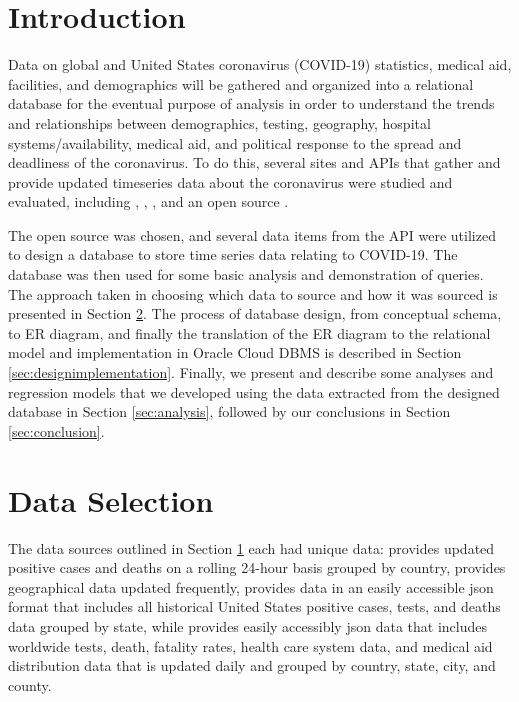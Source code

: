 \documentclass[11pt]{article}
\newcommand{\MYhref}[3][blue]{\href{#2}{\color{#1}{#3}}}%
\begin{document}
\pagebreak

\section{Introduction}
\label{sec:Intro}
\noindent
Data on global and United States coronavirus (COVID-19) statistics, medical aid, facilities, and demographics will be gathered and organized into a relational database for the eventual purpose of analysis in order to understand the trends and relationships between demographics, testing, geography, hospital systems/availability, medical aid, and political response to the spread and deadliness of the coronavirus. To do this, several sites and APIs that gather and provide updated timeseries data about the coronavirus were studied and evaluated, including \MYhref{https://www.worldometers.info/coronavirus/}{Worldometer}, \MYhref{https://coronavirus.jhu.edu/map.html}{John Hopkins Coronavirus Resource Center}, \MYhref{https://covidtracking.com/api}{The Covid Tracking Project}, and an open source \MYhref{https://www.npmjs.com/package/covid19-api}{Covid-19 API}. 

\noindent
The open source \MYhref{https://www.npmjs.com/package/covid19-api}{Covid-19 API} was chosen, and several data items from the API were utilized to design a database to store time series data relating to COVID-19. The database was then used for some basic analysis and demonstration of queries. The approach taken in choosing which data to source and how it was sourced is presented in Section \ref{sec:approachsec}. The process of database design, from conceptual schema, to ER diagram, and finally the translation of the ER diagram to the relational model and implementation in Oracle Cloud DBMS is described in Section \ref{sec:designimplementation}. Finally, we present and describe some analyses and regression models that we developed using the data extracted from the designed database in Section \ref{sec:analysis}, followed by our conclusions in Section \ref{sec:conclusion}.

\section{Data Selection}
\label{sec:approachsec}

\noindent
The data sources outlined in Section \ref{sec:Intro} each had unique data: \MYhref{https://www.worldometers.info/coronavirus/}{Worldometer} provides updated positive cases and deaths on a rolling 24-hour basis grouped by country, \MYhref{https://coronavirus.jhu.edu/map.html}{John Hopkins Coronavirus Resource Center} provides geographical data updated frequently, \MYhref{https://covidtracking.com/api}{The Covid Tracking Project} provides data in an easily accessible json format that includes all historical United States positive cases, tests, and deaths data grouped by state, while \MYhref{https://www.npmjs.com/package/covid19-api}{Covid-19 API} provides easily accessibly json data that includes worldwide tests, death, fatality rates, health care system data, and medical aid distribution data that is updated daily and grouped by country, state, city, and county.
\end{document}
